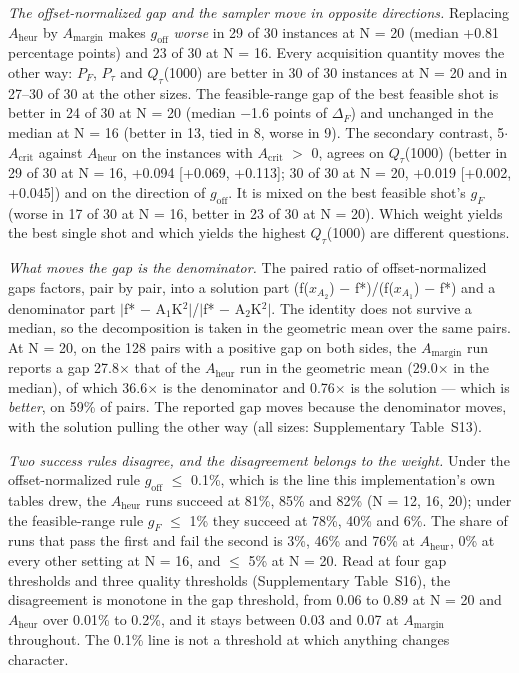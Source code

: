 \documentclass{ieeeaccess}
\begin{document}
\textit{The offset-normalized gap and the sampler move in opposite directions.} Replacing $A_{\mathrm{heur}}$ by $A_{\mathrm{margin}}$ makes $g_{\mathrm{off}}$ \textit{worse} in 29 of 30 instances at N = 20 (median +0.81 percentage points) and 23 of 30 at N = 16. Every acquisition quantity moves the other way: $P_{F}$, $P_{\tau}$ and $Q_{\tau}$(1000) are better in 30 of 30 instances at N = 20 and in 27--30 of 30 at the other sizes. The feasible-range gap of the best feasible shot is better in 24 of 30 at N = 20 (median $-$1.6 points of $\Delta_{F}$) and unchanged in the median at N = 16 (better in 13, tied in 8, worse in 9). The secondary contrast, 5$\cdot$$A_{\mathrm{crit}}$ against $A_{\mathrm{heur}}$ on the instances with $A_{\mathrm{crit}}$ $>$ 0, agrees on $Q_{\tau}$(1000) (better in 29 of 30 at N = 16, +0.094 [+0.069, +0.113]; 30 of 30 at N = 20, +0.019 [+0.002, +0.045]) and on the direction of $g_{\mathrm{off}}$. It is mixed on the best feasible shot's $g_{F}$ (worse in 17 of 30 at N = 16, better in 23 of 30 at N = 20). Which weight yields the best single shot and which yields the highest $Q_{\tau}$(1000) are different questions.


\textit{What moves the gap is the denominator.} The paired ratio of offset-normalized gaps factors, pair by pair, into a solution part (f($x_{{A_{2}}}$) $-$ f*)/(f($x_{{A_{1}}}$) $-$ f*) and a denominator part $|$f* $-$ A$_1$K$^{2}$$|$/$|$f* $-$ A$_2$K$^{2}$$|$. The identity does not survive a median, so the decomposition is taken in the geometric mean over the same pairs. At N = 20, on the 128 pairs with a positive gap on both sides, the $A_{\mathrm{margin}}$ run reports a gap 27.8$\times$ that of the $A_{\mathrm{heur}}$ run in the geometric mean (29.0$\times$ in the median), of which 36.6$\times$ is the denominator and 0.76$\times$ is the solution --- which is \textit{better}, on 59\% of pairs. The reported gap moves because the denominator moves, with the solution pulling the other way (all sizes: Supplementary Table~S13).


\textit{Two success rules disagree, and the disagreement belongs to the weight.} Under the offset-normalized rule $g_{\mathrm{off}}$ $\leq$ 0.1\%, which is the line this implementation's own tables drew, the $A_{\mathrm{heur}}$ runs succeed at 81\%, 85\% and 82\% (N = 12, 16, 20); under the feasible-range rule $g_{F}$ $\leq$ 1\% they succeed at 78\%, 40\% and 6\%. The share of runs that pass the first and fail the second is 3\%, 46\% and 76\% at $A_{\mathrm{heur}}$, 0\% at every other setting at N = 16, and $\leq$ 5\% at N = 20. Read at four gap thresholds and three quality thresholds (Supplementary Table~S16), the disagreement is monotone in the gap threshold, from 0.06 to 0.89 at N = 20 and $A_{\mathrm{heur}}$ over 0.01\% to 0.2\%, and it stays between 0.03 and 0.07 at $A_{\mathrm{margin}}$ throughout. The 0.1\% line is not a threshold at which anything changes character.
\end{document}
